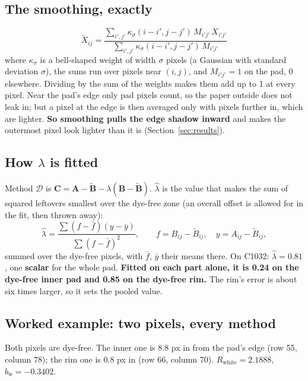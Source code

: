 \documentclass[11pt,letterpaper]{article}
\newcommand{\SCALAR}{\textbf{scalar}}
\newcommand{\mA}{\mathbf{A}}   %
\newcommand{\mB}{\mathbf{B}}   %
\newcommand{\mC}{\mathbf{C}}   %
\newcommand{\tB}{\widetilde{\mathbf{B}}}
\newcommand{\Rwhite}{R_{\text{white}}}
\newcommand{\bw}{b_{\text{w}}}
\newcommand{\MD}{\mathcal{D}}
\begin{document}
\subsection{The smoothing, exactly}
\label{sec:smooth}

\begin{equation}
  \tilde X_{ij} = \frac{\sum_{i',j'} \kappa_\sigma(i - i', j - j')\,
                        M_{i'j'}\, X_{i'j'}}
                       {\sum_{i',j'} \kappa_\sigma(i - i', j - j')\, M_{i'j'}}
\end{equation}
where $\kappa_\sigma$ is a bell-shaped weight of width $\sigma$ pixels (a
Gaussian with standard deviation $\sigma$), the sums run over pixels near
$(i, j)$, and $M_{i'j'} = 1$ on the pad, 0 elsewhere.  Dividing by the sum
of the weights makes them add up to 1 at every pixel.  Near the pad's edge
only pad pixels count, so the paper outside does not leak in; but a pixel at
the edge is then averaged only with pixels further in, which are lighter.
\textbf{So smoothing pulls the edge shadow inward} and makes the outermost
pixel look lighter than it is (Section~\ref{sec:results}).

\subsection{How \texorpdfstring{$\lambda$}{lambda} is fitted}

Method $\MD$ is $\mC = \mA - \tB - \lambda(\mB - \tB)$.  $\hat\lambda$ is the
value that makes the sum of squared leftovers smallest over the dye-free
zone (an overall offset is allowed for in the fit, then thrown away):
\begin{equation}
  \hat\lambda = \frac{\sum (f - \bar f)(y - \bar y)}{\sum (f - \bar f)^2},
  \qquad f = B_{ij} - \tilde B_{ij},\quad y = A_{ij} - \tilde B_{ij},
\end{equation}
summed over the dye-free pixels, with $\bar f$, $\bar y$ their means there.
On C1032: $\hat\lambda = 0.81$, one \SCALAR{} for the whole pad.
\textbf{Fitted on each part alone, it is 0.24 on the dye-free inner pad and
0.85 on the dye-free rim.}  The rim's error is about six times larger, so
it sets the pooled value.

\subsection{Worked example: two pixels, every method}

Both pixels are dye-free.  The inner one is 8.8 px in from the pad's edge
(row 55, column 78); the rim one is 0.8 px in (row 66, column 70).
$\Rwhite = 2.1888$, $\bw = -0.3402$.
\end{document}
